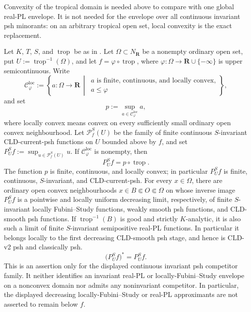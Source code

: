 Convexity of the tropical domain is needed above to compare with one global
real-PL envelope.  It is not needed for the envelope over all continuous
invariant psh minorants: on an arbitrary tropical open set, local convexity
is the exact replacement.
\begin{corollary}
\label{cor:p033-invariant-toric-locally-convex-envelope}
Let \(K\), \(T\), \(S\), and \(\operatorname{trop}\) be as in
.  Let
\(\Omega\subset N_{\mathbf R}\) be a nonempty ordinary open set, put
\(U:=\operatorname{trop}^{-1}(\Omega)\), and let
\(f=\varphi\circ\operatorname{trop}\), where
\(\varphi:\Omega\to\mathbf R\cup\{-\infty\}\) is upper semicontinuous.
Write
\[
 \mathcal C^{\mathrm{loc}}_\varphi
 :=\left\{a:\Omega\to\mathbf R\,\middle|\,
     \substack{a\text{ is finite, continuous, and locally convex,}\\
               a\leq\varphi}\right\},
\]
and set
\[
                         p:=\sup_{a\in\mathcal C^{\mathrm{loc}}_\varphi}a,
\]
where locally convex means convex on every sufficiently small ordinary open
convex neighbourhood.  Let \(\mathcal P^S_f(U)\) be the family of finite
continuous \(S\)-invariant CLD-current-psh functions on \(U\) bounded above
by \(f\), and set \(P^S_Uf:=\sup_{u\in\mathcal P^S_f(U)}u\).  If
\(\mathcal C^{\mathrm{loc}}_\varphi\) is nonempty, then
\[
                       P^S_Uf=p\circ\operatorname{trop}.
\]
The function \(p\) is finite, continuous, and locally convex; in particular
\(P^S_Uf\) is finite, continuous, \(S\)-invariant, and CLD-current-psh.
For every \(x\in\Omega\), there are ordinary open convex neighbourhoods
\(x\in B\Subset O\Subset\Omega\) on whose inverse image \(P^S_Uf\) is a
pointwise and locally uniform decreasing limit, respectively, of finite
\(S\)-invariant locally Fubini--Study functions, weakly smooth psh functions,
and CLD-smooth psh functions.  If \(\operatorname{trop}^{-1}(B)\) is good
and strictly \(K\)-analytic, it is also such a limit of finite
\(S\)-invariant semipositive real-PL functions.  In particular it belongs
locally to the first decreasing CLD-smooth psh stage, and hence is CLD-v2 psh
and classically psh.
\[
                         \bigl(P^S_Uf\bigr)^*=P^S_Uf.
\]
This is an assertion only for the displayed continuous invariant psh
competitor family.  It neither identifies an invariant real-PL or
locally-Fubini--Study envelope on a nonconvex domain nor admits any
noninvariant competitor.  In particular, the displayed decreasing
locally-Fubini--Study or real-PL approximants are not asserted to remain
below \(f\).
\end{corollary}
